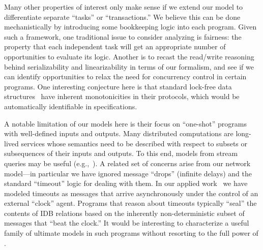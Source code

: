 Many other properties of interest only make sense if we extend our model to differentiate separate ``tasks'' or ``transactions.'' We believe this can be done mechanistically by introducing some bookkeeping logic into each \lang program.  Given such a framework, one traditional issue to consider analyzing is fairness: the property that each independent task will get an appropriate number of opportunities to evaluate its logic.  Another is to recast the read/write reasoning behind serializability and linearizability in terms of our formalism, and see if we can identify opportunities to relax the need for concurrency control in certain programs.  One interesting conjecture here is that standard lock-free data structures~\cite{lockfree} have inherent monotonicities in their protocols, which would be automatically identifiable in \lang specifications.

A notable limitation of our models here is their focus on ``one-shot'' programs with well-defined inputs and outputs.  Many distributed computations are long-lived services whose semantics need to be described with respect to subsets or subsequences of their inputs and outputs.  To this end, models from stream queries may be useful (e.g.,~\cite{Chandramouli2009}).  A related set of concerns arise from our network model---in particular we have ignored message ``drops'' (infinite delays) and the standard ``timeout'' logic for dealing with them.  In our applied work~\cite{boom,cidr11} we have modeled timeouts as messages that arrive asynchronously under the control of an external ``clock'' agent.  Programs that reason about timeouts typically ``seal'' the contents of IDB relations based on the inherently non-deterministic subset of messages that ``beat the clock.''  It would be interesting to characterize a useful family of ultimate models in such programs without resorting to the full power of \lang.